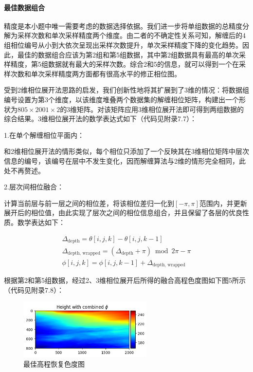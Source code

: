 \documentclass[a4paper]{article}
\begin{document}
	\paragraph{最佳数据组合}
	精度是本小题中唯一需要考虑的数据选择依据。我们进一步将单组数据的总精度分解为采样次数和单次采样精度两个维度。由二者的不确定性关系可知，解缠后的4组相位编号从小到大依次呈现出采样次数提升，单次采样精度下降的变化趋势。因此，最佳的数据组合应该为第2组和第5组数据，其中第2组数据具有最高的单次采样精度，第5组数据就有最大的采样次数。综合2和5的信息，就可以得到一个在采样次数和单次采样精度两方面都有很高水平的修正相位图。\par
	受到2维相位展开法思路的启发，我们创新性地将其扩展到了3维的情况：将数据组编号设置为第3个维度，以该维度堆叠两个数据集的解缠相位矩阵，构建出一个形状为$ 805\times2001\times2 $的3维矩阵。对该矩阵应用3维相位展开法即可得到两组数据的综合结果。3维相位展开法的数学表达式如下（代码见附录7.7）：\par
	\noindent1.在单个解缠相位平面内：\par\indent
	和2维相位展开法的情形类似，每个相位只添加了一个反映其在3维相位矩阵中层次信息的编号，该编号在层中不发生变化，因而解缠算法与2维的情形完全相同，此处不再赘述。\par
	\noindent2.层次间相位融合：\par\indent
	计算当前层与前一层之间的相位差，将该相位差归一化到$ [-\pi,\pi] $范围内，并更新展开后的相位值，由此实现了层次之间的相位信息组合，并且保留了各层的优良性质。数学表达如下：\par
	\begin{subequations}
		\begin{align}
			\Delta_{\text{depth}} = \theta[i,j,k] - \theta[i,j,k-1] \\
			\Delta_{\text{depth, wrapped}} = \left( \Delta_{\text{depth}} + \pi \right) \bmod 2\pi - \pi \\
			\phi[i,j,k] = \phi[i,j,k-1] + \Delta_{\text{depth, wrapped}}
		\end{align}
	\end{subequations}
	
	根据第2和第5组数据，经过2、3维相位展开后所得的融合高程色度图如下图5所示（代码见附录7.8）：\par

	\begin{figure}[H]
		\centering
		\includegraphics[width=0.6\textwidth]{t1/output_1_2.png}
		\caption{最佳高程恢复色度图}
		\label{fig:best_phi}
	\end{figure}
\end{document}
